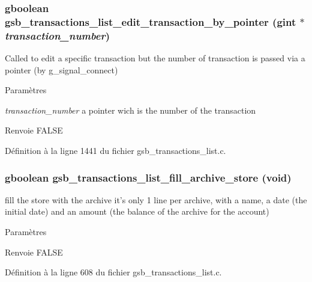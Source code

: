 \subsubsection[{gsb\_\-transactions\_\-list\_\-edit\_\-transaction\_\-by\_\-pointer}]{\setlength{\rightskip}{0pt plus 5cm}gboolean gsb\_\-transactions\_\-list\_\-edit\_\-transaction\_\-by\_\-pointer (gint $\ast$ {\em transaction\_\-number})}\label{gsb__transactions__list_8h_a586edcd7d904b6fd75ab87544f8609fa}
Called to edit a specific transaction but the number of transaction is passed via a pointer (by g\_\-signal\_\-connect)


\begin{DoxyParams}{Paramètres}
\item[{\em transaction\_\-number}]a pointer wich is the number of the transaction\end{DoxyParams}
\begin{DoxyReturn}{Renvoie}
FALSE 
\end{DoxyReturn}


Définition à la ligne 1441 du fichier gsb\_\-transactions\_\-list.c.

\subsubsection[{gsb\_\-transactions\_\-list\_\-fill\_\-archive\_\-store}]{\setlength{\rightskip}{0pt plus 5cm}gboolean gsb\_\-transactions\_\-list\_\-fill\_\-archive\_\-store (void)}\label{gsb__transactions__list_8h_a1a818af14b9c3c740d85b2c76cae24d5}
fill the store with the archive it's only 1 line per archive, with a name, a date (the initial date) and an amount (the balance of the archive for the account)


\begin{DoxyParams}{Paramètres}
\item[{\em }]\end{DoxyParams}
\begin{DoxyReturn}{Renvoie}
FALSE 
\end{DoxyReturn}


Définition à la ligne 608 du fichier gsb\_\-transactions\_\-list.c.

